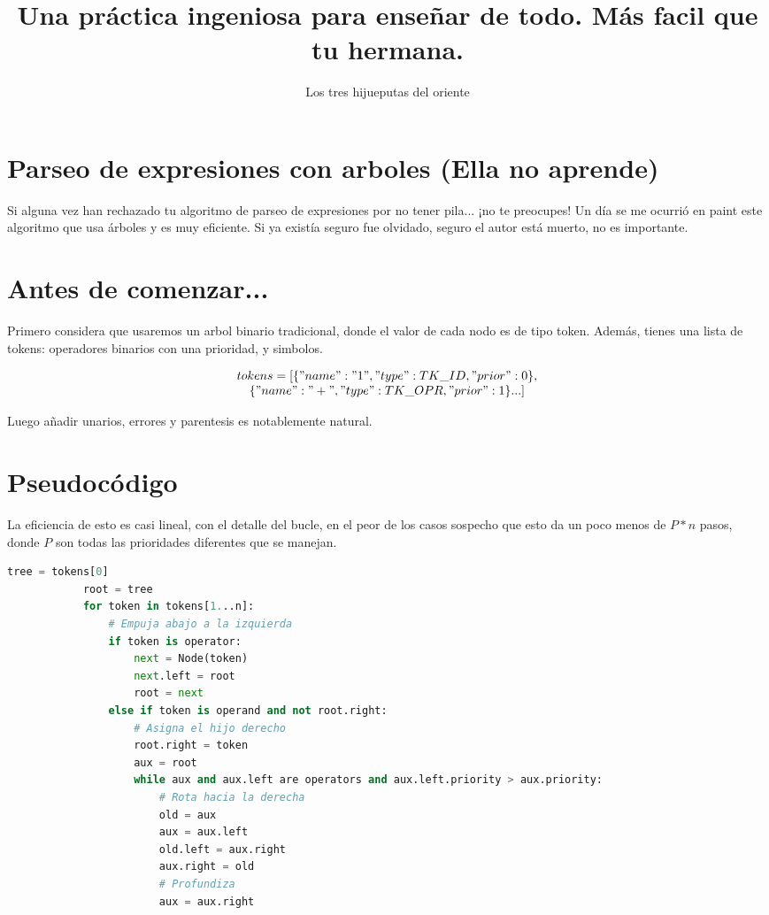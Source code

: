 \documentclass{article}
\title{Una práctica ingeniosa para enseñar de todo. Más facil que tu hermana.}
\author{Los tres hijueputas del oriente}
\begin{document}
	
	
	{\centering \section*{Parseo de expresiones con arboles (Ella no aprende)}}
	
	Si alguna vez han rechazado tu algoritmo de parseo de expresiones por no tener pila... ¡no te preocupes! Un día se me ocurrió en paint este algoritmo que usa árboles y es muy eficiente. Si ya existía seguro fue olvidado, seguro el autor está muerto, no es importante.
	
	\setcounter{section}{0}
	
	\begin{multicols}{2}
		\section{Antes de comenzar...}
		
		Primero considera que usaremos un arbol binario tradicional, donde el valor de cada nodo es de tipo token.
		Además, tienes una lista de tokens: operadores binarios con una prioridad, y simbolos.
		
		\[
		\begin{array}{c}
			tokens = [\{"name": "1", "type":TK\_ID, "prior":0\}, \\
			\{"name": "+", "type":TK\_OPR, "prior":1\} ...]
		\end{array}
		\]
		
		Luego añadir unarios, errores y parentesis es notablemente natural.
		
		\section{Pseudocódigo}
		
		La eficiencia de esto es casi lineal, con el detalle del bucle, en el peor de los casos sospecho que esto da un poco menos de $P * n$ pasos, donde $P$ son todas las prioridades diferentes que se manejan.
		
		\begin{lstlisting}[language=python]
			tree = tokens[0]
			root = tree
			for token in tokens[1...n]:
				# Empuja abajo a la izquierda
				if token is operator:
					next = Node(token)
					next.left = root
					root = next
				else if token is operand and not root.right:
					# Asigna el hijo derecho
					root.right = token
					aux = root
					while aux and aux.left are operators and aux.left.priority > aux.priority:
						# Rota hacia la derecha
						old = aux
						aux = aux.left
						old.left = aux.right
						aux.right = old
						# Profundiza
						aux = aux.right
		\end{lstlisting}
		

\end{multicols}
\end{document}
